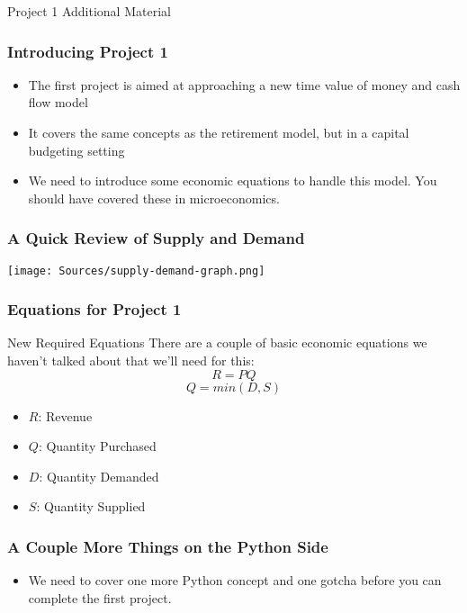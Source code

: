 \documentclass[handout, 11pt]{beamer}
\begin{document}
\begin{section}[Project 1]{Project 1 Additional Material}
\begin{frame}
\frametitle{Introducing Project 1}
\begin{itemize}
\item The first project is aimed at approaching a new time value of money and cash flow model
\vfill
\item It covers the same concepts as the retirement model, but in a capital budgeting setting
\vfill
\item We need to introduce some economic equations to handle this model. You should have covered these in microeconomics.
\end{itemize}
\end{frame}
\begin{frame}
\frametitle{A Quick Review of Supply and Demand}
\begin{center}
\begin{adjustbox}{width=0.9\textwidth, height=0.8\textheight, keepaspectratio}
\texttt{[image: Sources/supply-demand-graph.png]}
\end{adjustbox}
\end{center}
\end{frame}
\begin{frame}
\frametitle{Equations for Project 1}
\begin{block}{New Required Equations}
There are a couple of basic economic equations we haven't talked about that we'll need for this:
\begin{equation}
	R = PQ
\end{equation}
\begin{equation}
	Q = min(D, S)
\end{equation}
\begin{itemize}
\item $R$: Revenue
\item $Q$: Quantity Purchased
\item $D$: Quantity Demanded
\item $S$: Quantity Supplied
\end{itemize}
\end{block}
\end{frame}
\begin{frame}
\frametitle{A Couple More Things on the Python Side}
\begin{itemize}
\item We need to cover one more Python concept and one gotcha before you can complete the first project.

\end{itemize}
\end{frame}
\end{section}
\end{document}
